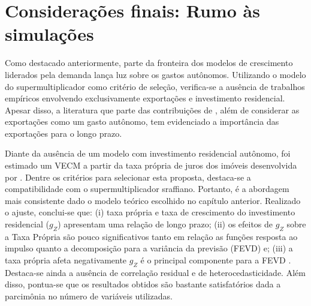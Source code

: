 \section{Considerações finais: Rumo às simulações}
\label{Conclucao_Empirica}


Como destacado anteriormente, parte da fronteira dos modelos de crescimento liderados pela demanda lança luz sobre os gastos autônomos. Utilizando o modelo do supermultiplicador como critério de seleção, verifica-se a ausência de trabalhos empíricos envolvendo exclusivamente exportações e investimento residencial. Apesar disso, a literatura que parte das contribuições de \textcite{mccombie_balance--payments_1994}, além de considerar as exportações como um gasto autônomo, tem evidenciado  a importância das exportações para o longo prazo. 




Diante da ausência de um modelo com investimento residencial autônomo, foi estimado um VECM a partir da taxa própria de juros dos imóveis desenvolvida por \textcite{teixeira_crescimento_2015}. Dentre os critérios para selecionar esta proposta, destaca-se a compatibilidade com o supermultiplicador sraffiano. Portanto, é a abordagem mais consistente dado o modelo teórico escolhido no capítulo anterior. Realizado o ajuste, conclui-se que: 
(i) taxa própria e taxa de crescimento do investimento residencial ($g_Z$) apresentam uma relação de longo prazo; 
(ii) os efeitos de $g_Z$ sobre a Taxa Própria são pouco significativos tanto em relação as funções resposta ao impulso quanto a decomposição para a variância da previsão (FEVD) e;
(iii) a taxa própria afeta negativamente $g_Z$ é o principal componente para a FEVD . 
Destaca-se ainda a ausência de correlação residual e de heterocedasticidade. Além disso, pontua-se que os resultados obtidos são bastante satisfatórios dada a parcimônia no número de variáveis utilizadas.

